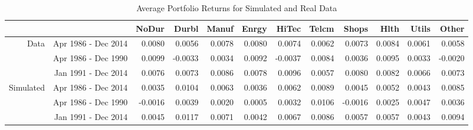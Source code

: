 \begin{sidewaystable}[ht]
	\centering
	\begin{tabular}{rrrrrrrrrrrr}
		\hline
		& & NoDur & Durbl & Manuf & Enrgy & HiTec & Telcm & Shops & Hlth & Utils & Other \\ 
		\hline
		\multirow{3}{*}{Data} & Apr 1986 - Dec 2014 & 0.0080 & 0.0056 & 0.0078 & 0.0080 & 0.0074 & 0.0062 & 0.0073 & 0.0084 & 0.0061 & 0.0058 \\ 
		& Apr 1986 - Dec 1990 & 0.0099 & -0.0033 & 0.0034 & 0.0092 & -0.0037 & 0.0084 & 0.0036 & 0.0095 & 0.0033 & -0.0020 \\ 
		& Jan 1991 - Dec 2014 & 0.0076 & 0.0073 & 0.0086 & 0.0078 & 0.0096 & 0.0057 & 0.0080 & 0.0082 & 0.0066 & 0.0073 \\ 
		\hline
		\multirow{3}{*}{Simulated} & Apr 1986 - Dec 2014 & 0.0035 & 0.0104 & 0.0063 & 0.0036 & 0.0062 & 0.0089 & 0.0045 & 0.0052 & 0.0043 & 0.0085 \\ 
		& Apr 1986 - Dec 1990 & -0.0016 & 0.0039 & 0.0020 & 0.0005 & 0.0032 & 0.0106 & -0.0016 & 0.0025 & 0.0047 & 0.0036 \\ 
		& Jan 1991 - Dec 2014 & 0.0045 & 0.0117 & 0.0071 & 0.0042 & 0.0067 & 0.0086 & 0.0057 & 0.0057 & 0.0043 & 0.0094 \\ 
		\hline
	\end{tabular}
	\caption{Average Portfolio Returns for Simulated and Real Data}
\end{sidewaystable}

